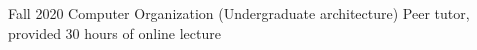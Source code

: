 

\begin{cvlist}

  \cvlistitem
    {Fall 2020 Computer Organization (Undergraduate architecture)} %
    {Peer tutor, provided 30 hours of online lecture} %

\end{cvlist}
